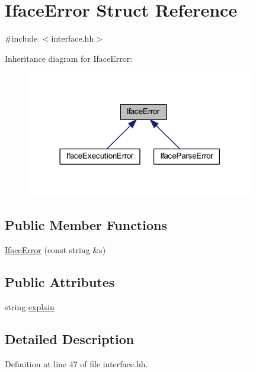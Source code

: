 \hypertarget{struct_iface_error}{}\section{Iface\+Error Struct Reference}
\label{struct_iface_error}


{\ttfamily \#include $<$interface.\+hh$>$}



Inheritance diagram for Iface\+Error\+:
\nopagebreak
\begin{figure}[H]
\begin{center}
\leavevmode
\includegraphics[width=282pt]{struct_iface_error__inherit__graph}
\end{center}
\end{figure}
\subsection*{Public Member Functions}
\begin{DoxyCompactItemize}
\item 
\mbox{\hyperlink{struct_iface_error_a93bb43a011b15405bc293c08f9ca834a}{Iface\+Error}} (const string \&s)
\end{DoxyCompactItemize}
\subsection*{Public Attributes}
\begin{DoxyCompactItemize}
\item 
string \mbox{\hyperlink{struct_iface_error_ab688dd18578c0ece6519447af6fd631d}{explain}}
\end{DoxyCompactItemize}


\subsection{Detailed Description}


Definition at line 47 of file interface.\+hh.



